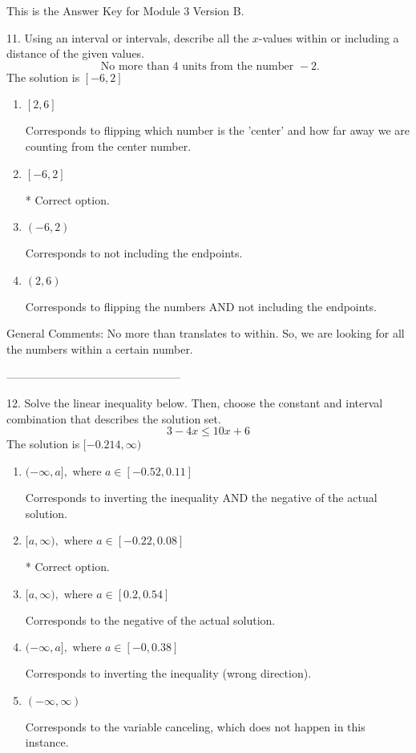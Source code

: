 \documentclass{article}[10pt]
\begin{document}
This is the Answer Key for Module 3 Version B.

11. Using an interval or intervals, describe all the $x$-values within or including a distance of the given values.
$$ \text{ No more than } 4 \text{ units from the number } -2. $$ 
The solution is $ [-6, 2] $ 

\begin{enumerate}[label=\Alph*.] 
\item $ [2, 6] $ 

 Corresponds to flipping which number is the 'center' and how far away we are counting from the center number. 
\item $ [-6, 2] $ 

 * Correct option. 
\item $ (-6, 2) $ 

 Corresponds to not including the endpoints. 
\item $ (2, 6) $ 

 Corresponds to flipping the numbers AND not including the endpoints. 
\end{enumerate} 
 
General Comments: No more than translates to within. So, we are looking for all the numbers within a certain number.

-----------------------------------------------

12. Solve the linear inequality below. Then, choose the constant and interval combination that describes the solution set.
$$ 3 - 4 x \leq 10 x + 6 $$ 
The solution is $ [-0.214, \infty) $ 

\begin{enumerate}[label=\Alph*.] 
\item $ (-\infty, a], \text{ where } a \in [-0.52, 0.11] $ 

 Corresponds to inverting the inequality AND the negative of the actual solution. 
\item $ [a, \infty), \text{ where } a \in [-0.22, 0.08] $ 

  * Correct option. 
\item $ [a, \infty), \text{ where } a \in [0.2, 0.54] $ 

 Corresponds to the negative of the actual solution. 
\item $ (-\infty, a], \text{ where } a \in [-0, 0.38] $ 

 Corresponds to inverting the inequality (wrong direction). 
\item $ (-\infty, \infty) $ 

 Corresponds to the variable canceling, which does not happen in this instance. 
\end{enumerate} 
 
\end{document}
